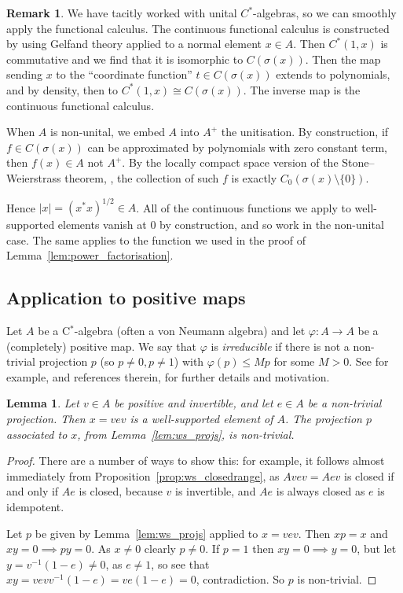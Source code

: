 \documentclass[twoside,a4paper,12pt]{article}
\theoremstyle{plain}
\newtheorem{lemma}[proposition]{Lemma}
\theoremstyle{definition}
\newtheorem{remark}[proposition]{Remark}
\begin{document}
\begin{remark}
We have tacitly worked with unital $C^*$-algebras, so we can smoothly apply the functional calculus.  The continuous functional calculus is constructed by using Gelfand theory applied to a normal element $x\in A$.  Then $C^*(1,x)$ is commutative and we find that it is isomorphic to $C(\sigma(x))$.  Then the map sending $x$ to the ``coordinate function'' $t \in C(\sigma(x))$ extends to polynomials, and by density, then to $C^*(1,x) \cong C(\sigma(x))$.  The inverse map is the continuous functional calculus.

When $A$ is non-unital, we embed $A$ into $A^+$ the unitisation.  By construction, if $f \in C(\sigma(x))$ can be approximated by polynomials with zero constant term, then $f(x) \in A$ not $A^+$.  By the locally compact space version of the Stone--Weierstrass theorem, \cite[Corollary~V.8.3]{conway}, the collection of such $f$ is exactly $C_0(\sigma(x)\setminus\{0\})$.

Hence $|x| = (x^*x)^{1/2} \in A$.  All of the continuous functions we apply to well-supported elements vanish at $0$ by construction, and so work in the non-unital case.  The same applies to the function we used in the proof of Lemma~\ref{lem:power_factorisation}.
\end{remark}


\subsection{Application to positive maps}

Let $A$ be a C$^*$-algebra (often a von Neumann algebra) and let $\varphi \colon A \to A$ be a (completely) positive map.  We say that $\varphi$ is \emph{irreducible} if there is not a non-trivial projection $p$ (so $p\not=0, p\not=1$) with $\varphi(p) \leq M p$ for some $M>0$.  See \cite[Proposition~1]{F} for example, and references therein, for further details and motivation.

\begin{lemma}
Let $v\in A$ be positive and invertible, and let $e\in A$ be a non-trivial projection.  Then $x = vev$ is a well-supported element of $A$.  The projection $p$ associated to $x$, from Lemma~\ref{lem:ws_projs}, is non-trivial.
\end{lemma}
\begin{proof}
There are a number of ways to show this: for example, it follows almost immediately from Proposition~\ref{prop:ws_closedrange}, as $Avev = Aev$ is closed if and only if $Ae$ is closed, because $v$ is invertible, and $Ae$ is always closed as $e$ is idempotent.

Let $p$ be given by Lemma~\ref{lem:ws_projs} applied to $x=vev$.  Then $xp=x$ and $xy=0 \implies py=0$.  As $x\not=0$ clearly $p\not=0$.  If $p=1$ then $xy=0\implies y=0$, but let $y=v^{-1}(1-e)\not=0$, as $e\not=1$, so see that $xy = vev v^{-1}(1-e) = ve(1-e) = 0$, contradiction.  So $p$ is non-trivial.
\end{proof}
\end{document}
